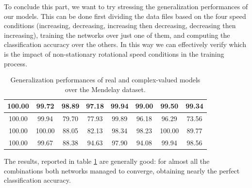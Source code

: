 \documentclass[../main.tex]{subfiles}
\begin{document}
To conclude this part, we want to try stressing the generalization performances of our models. This can be done first dividing the data files based on the four speed conditions (increasing, decreasing, increasing then decreasing, decreasing then increasing), training the networks over just one of them, and computing the classification accuracy over the others. In this way we can effectively verify which is the impact of non-stationary rotational speed conditions in the training process.
\begin{table}[!ht]
	\centering
	\begin{tabular}{||c|c||c|c||c|c||c|c||}
		\toprule
		100.00 & 99.72 & 98.89 & 97.18 & 99.94 & 99.00 & 99.50 & 99.34\\
		\midrule
		100.00 & 99.94 & 79.70 & 77.93 & 99.89 & 96.18 & 96.29 & 73.56\\
		\midrule
		100.00 & 100.00 & 88.05 & 82.13 & 98.34 & 98.23 & 100.00 & 89.77\\
		\midrule
		100.00 & 99.67 & 88.38 & 94.63 & 97.90 & 94.08 & 99.94 & 98.56\\
		\bottomrule
	\end{tabular}
	\caption{Generalization performances of real and complex-valued models over the Mendelay dataset.}
	\label{tab:mendeley_generalization}
\end{table}
The results, reported in table \ref{tab:mendeley_generalization} are generally good: for almost all the combinations both networks managed to converge, obtaining nearly the perfect classification accuracy.




	
\end{document}
